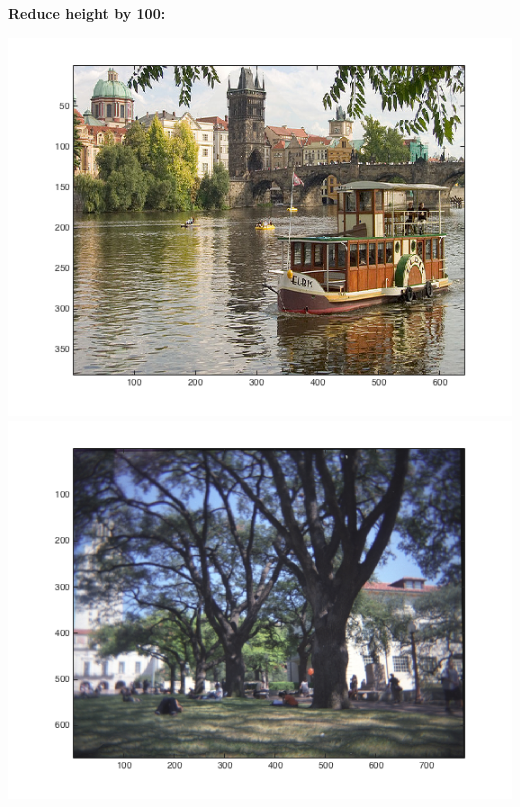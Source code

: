 \documentclass[11pt]{amsart}
\begin{document}
\subsection{}
\textbf{Reduce height by 100:} \\
\begin{center}
\includegraphics[scale=0.40]{outputReduceHeightPrague.png}
\includegraphics[scale=0.40]{outputReduceHeightMall.png}
\end{center}
\end{document}
